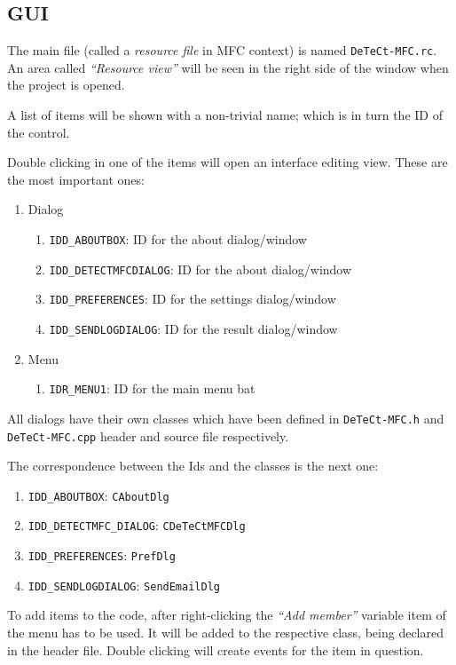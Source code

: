 \documentclass[a4paper,11pt]{memoir}
\begin{document}
\subsection{GUI}

The main file (called a \textit{resource file} in MFC context) is named \texttt{DeTeCt-MFC.rc}. An area called \textit{“Resource view”} will be seen in the right side of the window when the project is opened.

A list of items will be shown with a non-trivial name; which is in turn the ID of the control.

Double clicking in one of the items will open an interface editing view. These are the most important ones:
\begin{enumerate}
\item Dialog
\begin{enumerate}
\item \texttt{IDD\_ABOUTBOX}: ID for the about dialog/window
\item \texttt{IDD\_DETECTMFCDIALOG}: ID for the about dialog/window
\item \texttt{IDD\_PREFERENCES}: ID for the settings dialog/window
\item \texttt{IDD\_SENDLOGDIALOG}: ID for the result dialog/window
\end{enumerate}
\item Menu
\begin{enumerate}
\item \texttt{IDR\_MENU1}: ID for the main menu bat
\end{enumerate}
\end{enumerate}

All dialogs have their own classes which have been defined in \texttt{DeTeCt-MFC.h} and \texttt{DeTeCt-MFC.cpp} header and source file respectively.

The correspondence between the Ids and the classes is the next one:

\begin{enumerate}
\item \texttt{IDD\_ABOUTBOX}: \texttt{CAboutDlg}
\item \texttt{IDD\_DETECTMFC\_DIALOG}: \texttt{CDeTeCtMFCDlg}
\item \texttt{IDD\_PREFERENCES}: \texttt{PrefDlg}
\item \texttt{IDD\_SENDLOGDIALOG}: \texttt{SendEmailDlg}
\end{enumerate}

To add items to the code, after right-clicking the \textit{“Add member”} variable item of the menu has to be used. It will be added to the respective class, being declared in the header file. Double clicking will create events for the item in question.
\end{document}
